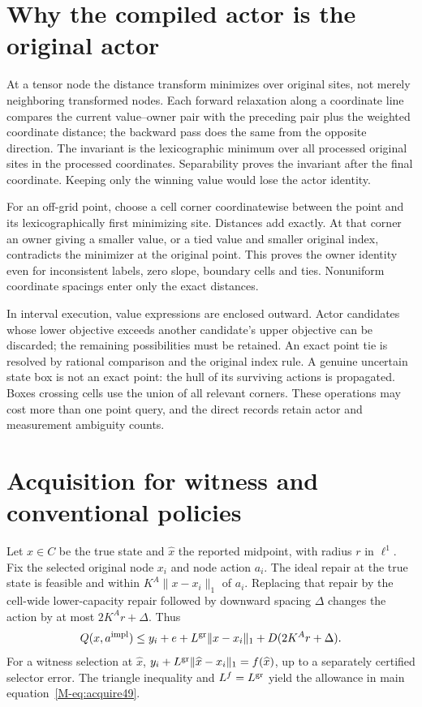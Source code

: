 \documentclass[ecta,nameyear,draft]{econsocart}
\begin{document}
\section{Why the compiled actor is the original actor}\label{supp:owner49}
At a tensor node the distance transform minimizes over original sites, not merely neighboring transformed nodes. Each forward relaxation along a coordinate line compares the current value--owner pair with the preceding pair plus the weighted coordinate distance; the backward pass does the same from the opposite direction. The invariant is the lexicographic minimum over all processed original sites in the processed coordinates. Separability proves the invariant after the final coordinate. Keeping only the winning value would lose the actor identity.

For an off-grid point, choose a cell corner coordinatewise between the point and its lexicographically first minimizing site. Distances add exactly. At that corner an owner giving a smaller value, or a tied value and smaller original index, contradicts the minimizer at the original point. This proves the owner identity even for inconsistent labels, zero slope, boundary cells and ties. Nonuniform coordinate spacings enter only the exact distances.

In interval execution, value expressions are enclosed outward. Actor candidates whose lower objective exceeds another candidate's upper objective can be discarded; the remaining possibilities must be retained. An exact point tie is resolved by rational comparison and the original index rule. A genuine uncertain state box is not an exact point: the hull of its surviving actions is propagated. Boxes crossing cells use the union of all relevant corners. These operations may cost more than one point query, and the direct records retain actor and measurement ambiguity counts.

\section{Acquisition for witness and conventional policies}\label{supp:acquisition49}
Let $x\in C$ be the true state and $\widehat x$ the reported midpoint, with radius $r$ in $\ell^1$. Fix the selected original node $x_i$ and node action $a_i$. The ideal repair at the true state is feasible and within $K^A\|x-x_i\|_1$ of $a_i$. Replacing that repair by the cell-wide lower-capacity repair followed by downward spacing $\Delta$ changes the action by at most $2K^Ar+\Delta$. Thus
\[
 Q(x,a^{\rm impl})\le y_i+e+L^{\rm gr}\|x-x_i\|_1+ D(2K^Ar+\Delta).
\]
For a witness selection at $\widehat x$, $y_i+L^{\rm gr}\|\widehat x-x_i\|_1=f(\widehat x)$, up to a separately certified selector error. The triangle inequality and $L^f=L^{\rm gr}$ yield the allowance in main equation~\eqref{M-eq:acquire49}.
\end{document}
